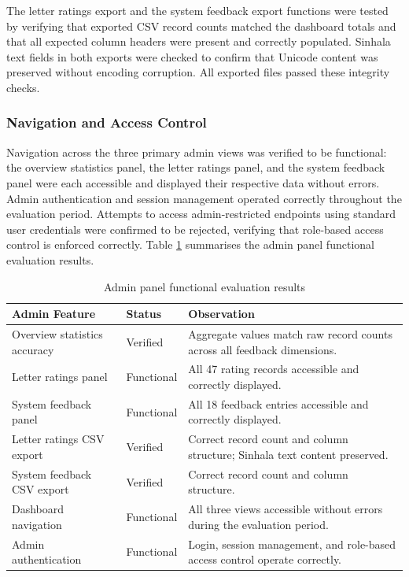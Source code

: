 \documentclass[12pt]{uomthesis}
\begin{document}
The letter ratings export and the system feedback export functions were tested by verifying that exported CSV record counts matched the dashboard totals and that all expected column headers were present and correctly populated. Sinhala text fields in both exports were checked to confirm that Unicode content was preserved without encoding corruption. All exported files passed these integrity checks.

\subsubsection{Navigation and Access Control}

Navigation across the three primary admin views was verified to be functional: the overview statistics panel, the letter ratings panel, and the system feedback panel were each accessible and displayed their respective data without errors. Admin authentication and session management operated correctly throughout the evaluation period. Attempts to access admin-restricted endpoints using standard user credentials were confirmed to be rejected, verifying that role-based access control is enforced correctly. Table \ref{tab:admin_panel_evaluation} summarises the admin panel functional evaluation results.

\begin{table}[!htbp]
\centering
\small
\begin{tabularx}{\linewidth}{@{}p{4.5cm}p{2.5cm}X@{}}
\toprule
\textbf{Admin Feature} & \textbf{Status} & \textbf{Observation} \\
\midrule
Overview statistics accuracy & Verified & Aggregate values match raw record counts across all feedback dimensions. \\
Letter ratings panel & Functional & All 47 rating records accessible and correctly displayed. \\
System feedback panel & Functional & All 18 feedback entries accessible and correctly displayed. \\
Letter ratings CSV export & Verified & Correct record count and column structure; Sinhala text content preserved. \\
System feedback CSV export & Verified & Correct record count and column structure. \\
Dashboard navigation & Functional & All three views accessible without errors during the evaluation period. \\
Admin authentication & Functional & Login, session management, and role-based access control operate correctly. \\
\bottomrule
\end{tabularx}
\caption{Admin panel functional evaluation results}
\label{tab:admin_panel_evaluation}
\end{table}
\end{document}
